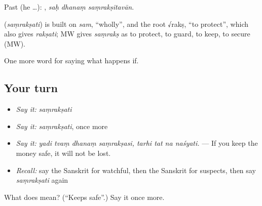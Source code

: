 Past (he …):   , \emph{saḥ dhanaṃ saṃrakṣitavān}.

\begin{cousinweb}
\textbf{} (\emph{saṃrakṣati}) is built on \emph{sam}, \textquotedblleft{}wholly\textquotedblright{}, and the root √rakṣ, \textquotedblleft{}to protect\textquotedblright{}, which also gives \emph{rakṣati}; MW gives \emph{saṃrakṣ} as to protect, to guard, to keep, to secure (MW).
\end{cousinweb}

\begin{grammarlens}[title={What you've built}]
One more word for saying what happens if.
\end{grammarlens}

\subsection*{Your turn}
\begin{itemize}
\raggedright
  \item \emph{Say it:} \emph{saṃrakṣati}
  \item \emph{Say it:} \emph{saṃrakṣati}, once more
  \item \emph{Say it:} \emph{yadi tvaṃ dhanaṃ saṃrakṣasi, tarhi tat na naśyati.} — If you keep the money safe, it will not be lost.
  \item \emph{Recall:} say the Sanskrit for watchful, then the Sanskrit for suspects, then say \emph{saṃrakṣati} again
\end{itemize}

\begin{tcolorbox}[breakable,colback=teal!4,colframe=teal!35!black,title={Before you move on}]
What does  mean? (\textquotedblleft{}Keeps safe\textquotedblright{}.) Say it once more.
\end{tcolorbox}
